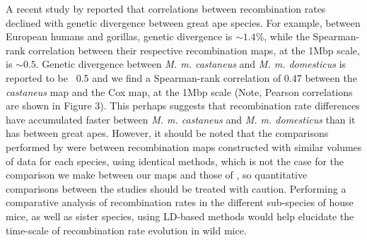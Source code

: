A recent study by \cite{RN221} reported that correlations between recombination rates declined with genetic divergence between great ape species. For example, between European humans and gorillas, genetic divergence is $\sim1.4\%$, while the Spearman-rank correlation between their respective recombination maps, at the 1Mbp scale, is $\sim0.5$. Genetic divergence between \emph{M. m. castaneus} and \emph{M. m. domesticus} is reported to be ~0.5 \citep{RN255} and we find a Spearman-rank correlation of 0.47 between the \textit{castaneus} map and the Cox map, at the 1Mbp scale (Note, Pearson correlations are shown in Figure 3). This perhaps suggests that recombination rate differences have accumulated faster between \emph{M. m. castaneus} and \emph{M. m. domesticus} than it has between great apes. However, it should be noted that the comparisons performed by \cite{RN221} were between recombination maps constructed with similar volumes of data for each species, using identical methods, which is not the case for the comparison we make between our maps and those of \cite{RN232}, so quantitative comparisons between the studies should be treated with caution. Performing a comparative analysis of recombination rates in the different sub-species of house mice, as well as sister species, using LD-based methods would help elucidate the time-scale of recombination rate evolution in wild mice.

